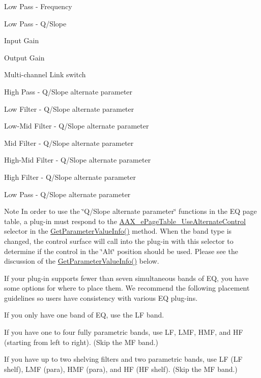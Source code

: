 \begin{DoxyItemize}
\begin{DoxyEnumerate}
\item Low Pass -\/ Frequency  
\item Low Pass -\/ Q/\+Slope  
\item Input Gain  
\item Output Gain  
\item Multi-\/channel Link switch  
\item High Pass -\/ Q/\+Slope alternate parameter  
\item Low Filter -\/ Q/\+Slope alternate parameter  
\item Low-\/\+Mid Filter -\/ Q/\+Slope alternate parameter  
\item Mid Filter -\/ Q/\+Slope alternate parameter  
\item High-\/\+Mid Filter -\/ Q/\+Slope alternate parameter  
\item High Filter -\/ Q/\+Slope alternate parameter  
\item Low Pass -\/ Q/\+Slope alternate parameter  
\end{DoxyEnumerate}
\end{DoxyItemize}

\begin{DoxyNote}{Note}
In order to use the \char`\"{}\+Q/\+Slope alternate parameter\char`\"{} functions in the E\+Q page table, a plug-\/in must respond to the \hyperlink{a00206_aa169208a2ce713fa021e20deb2eaf608a1a0d975a333d3aee81b22f878697e9c4}{A\+A\+X\+\_\+e\+Page\+Table\+\_\+\+Use\+Alternate\+Control} selector in the \hyperlink{a00018_a8f0a38e7445a97282ea3a295979bbbea}{Get\+Parameter\+Value\+Info()} method. When the band type is changed, the control surface will call into the plug-\/in with this selector to determine if the control in the \char`\"{}\+Alt\char`\"{} position should be used. Please see the discussion of the \hyperlink{a00018_a8f0a38e7445a97282ea3a295979bbbea}{Get\+Parameter\+Value\+Info()} below.
\end{DoxyNote}
If your plug-\/in supports fewer than seven simultaneous bands of E\+Q, you have some options for where to place them. We recommend the following placement guidelines so users have consistency with various E\+Q plug-\/ins. 
\begin{DoxyItemize}
\item If you only have one band of E\+Q, use the L\+F band.  
\item If you have one to four fully parametric bands, use L\+F, L\+M\+F, H\+M\+F, and H\+F (starting from left to right). (Skip the M\+F band.)  
\item If you have up to two shelving filters and two parametric bands, use L\+F (L\+F shelf), L\+M\+F (para), H\+M\+F (para), and H\+F (H\+F shelf). (Skip the M\+F band.)   
\end{DoxyItemize}


